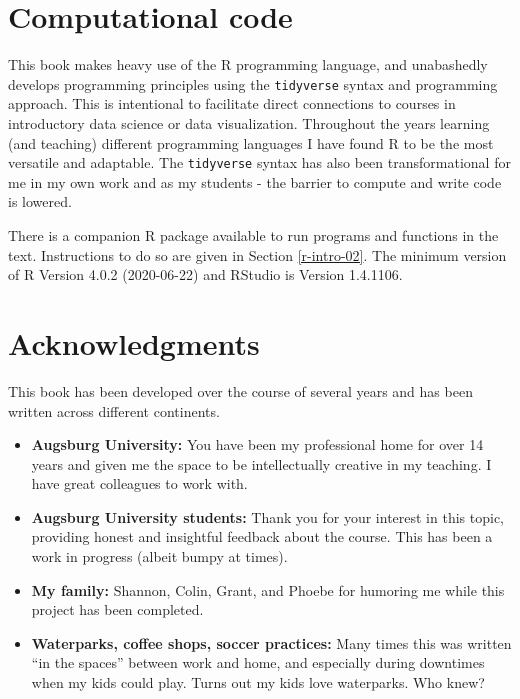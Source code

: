 \documentclass[
]{book}
\theoremstyle{definition}
\theoremstyle{definition}
\theoremstyle{definition}
\theoremstyle{remark}
\begin{document}
\hypertarget{computational-code}{%
\section*{Computational code}\label{computational-code}}

This book makes heavy use of the R programming language, and unabashedly develops programming principles using the \texttt{tidyverse} syntax and programming approach. This is intentional to facilitate direct connections to courses in introductory data science or data visualization. Throughout the years learning (and teaching) different programming languages I have found R to be the most versatile and adaptable. The \texttt{tidyverse} syntax has also been transformational for me in my own work and as my students - the barrier to compute and write code is lowered.

There is a companion R package available to run programs and functions in the text. Instructions to do so are given in Section \ref{r-intro-02}. The minimum version of R Version 4.0.2 (2020-06-22) and RStudio is Version 1.4.1106.

\hypertarget{acknowledgments}{%
\section*{Acknowledgments}\label{acknowledgments}}

This book has been developed over the course of several years and has been written across different continents.

\begin{itemize}
\item
  \textbf{Augsburg University:} You have been my professional home for over 14 years and given me the space to be intellectually creative in my teaching. I have great colleagues to work with.
\item
  \textbf{Augsburg University students:} Thank you for your interest in this topic, providing honest and insightful feedback about the course. This has been a work in progress (albeit bumpy at times).
\item
  \textbf{My family:} Shannon, Colin, Grant, and Phoebe for humoring me while this project has been completed.
\item
  \textbf{Waterparks, coffee shops, soccer practices:} Many times this was written ``in the spaces'' between work and home, and especially during downtimes when my kids could play. Turns out my kids love waterparks. Who knew?
\end{itemize}
\end{document}
